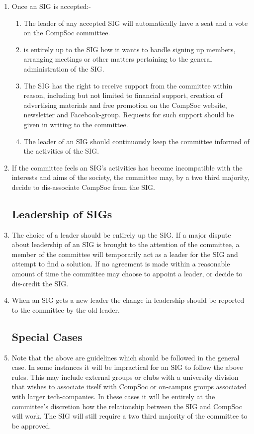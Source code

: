 \documentclass[a4paper]{article}
\begin{document}
\begin{enumerate}
  \item Once an SIG is accepted:-
    \begin{enumerate}
      \item The leader of any accepted SIG will automatically have a seat and a
        vote on the CompSoc committee.
      \item is entirely up to the SIG how it wants to handle signing up members,
        arranging meetings or other matters pertaining to the general
        administration of the SIG.
      \item The SIG has the right to receive support from the committee within
        reason, including but not limited to financial support, creation of
        advertising materials and free promotion on the CompSoc website,
        newsletter and Facebook-group. Requests for such support should
        be given in writing to the committee.
      \item The leader of an SIG should continuously keep the committee informed
        of the activities of the SIG.
    \end{enumerate}

    
  \item If the committee feels an SIG’s activities has become incompatible with
    the interests and aims of the society, the committee may, by a two third
    majority, decide to dis-associate CompSoc from the SIG.

  \subsection{Leadership of SIGs}

  \item The choice of a leader should be entirely up the SIG. If a major dispute
    about leadership of an SIG is brought to the attention of the committee, a
    member of the committee will temporarily act as a leader for the SIG and
    attempt to find a solution. If no agreement is made within a reasonable
    amount of time the committee may choose to appoint a leader, or decide
    to dis-credit the SIG.

  \item When an SIG gets a new leader the change in leadership should be reported
    to the committee by the old leader.

  \subsection{Special Cases}

  \item Note that the above are guidelines which should be followed in the general
    case. In some instances it will be impractical for an SIG to follow the
    above rules. This may include external groups or clubs with a university
    division that wishes to associate itself with CompSoc or on-campus groups
    associated with larger tech-companies. In these cases it will be entirely
    at the committee’s discretion how the relationship between the SIG and
    CompSoc will work. The SIG will still require a two third majority of the
    committee to be approved.

\end{enumerate}
\end{document}
